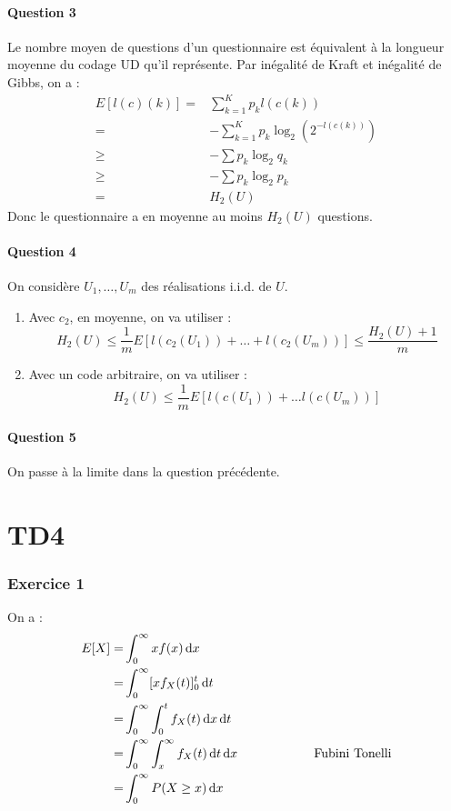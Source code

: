 \documentclass{cours}
\begin{document}
\subsection{Question 3}
Le nombre moyen de questions d'un questionnaire est équivalent à la longueur moyenne du codage UD qu'il représente. Par inégalité de Kraft et inégalité de Gibbs, on a : 
\[
    \begin{aligned}
        E[l(c)(k)] =& \sum_{k = 1}^{K}p_{k}l(c(k))\\
        =& -\sum_{k = 1}^{K}p_{k}\log_{2}(2^{-l(c(k))})\\
        \geq & -\sum p_{k}\log_{2}q_{k}\\
        \geq & -\sum p_{k}\log_{2}p_{k} \\
        = & H_{2}(U)
    \end{aligned}
\]
Donc le questionnaire a en moyenne au moins $H_{2}(U)$ questions. 

\subsection{Question 4}
On considère $U_{1},\ldots, U_{m}$ des réalisations i.i.d. de $U$. 
\begin{enumerate}
\item Avec $c_{2}$, en moyenne, on va utiliser : 
\[
    H_{2}(U) \leq \frac{1}{m}E[l(c_{2}(U_{1})) + \ldots + l(c_{2}(U_{m}))] \leq \frac{H_{2}(U) + 1}{m}
\]
\item Avec un code arbitraire, on va utiliser : 
\[
    H_{2}(U) \leq \frac{1}{m}E[l(c(U_{1})) + \ldots l(c(U_{m}))]
\]
\end{enumerate}


\subsection{Question 5}
On passe à la limite dans la question précédente. 

\part{TD4}
\section{Exercice 1}
On a : 
\[
	\begin{aligned}
		E[X] =& \int_{0}^{\infty}xf(x){\rm \, d} x\\
		=& \int_{0}^{\infty}[xf_{X}(t)]_{0}^{t}{\rm \, d} t\\
		=& \int_{0}^{\infty}\int_{0}^{t}f_{X}(t){\rm \, d} x {\rm \, d} t\\
		=& \int_{0}^{\infty}\int_{x}^{\infty}f_{X}(t){\rm \, d} t{\rm \, d} x \text{\hspace{2cm} Fubini Tonelli}\\
		=& \int_{0}^{\infty}P(X\geq x){\rm \, d} x
	\end{aligned}
\]
\end{document}
